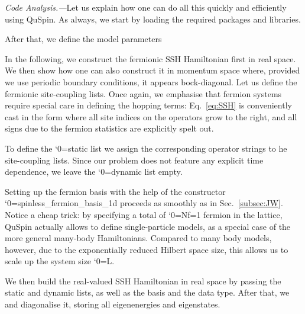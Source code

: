\documentclass{SciPost}
\newcommand\0{\scalebox{-1}[1]{0}}
\let\svttfamily\ttfamily
\renewcommand\ttfamily{\svttfamily\catcode`0=\active }
\renewcommand\texttt{\bgroup\ttfamily\texttthelp}
\def\texttthelp#1{#1\egroup}
\newcommand{\SSHcode}{example5.py}
\begin{document}
\noindent\emph{Code Analysis.---}Let us explain how one can do all this quickly and efficiently using QuSpin. As always, we start by loading the required packages and libraries.

After that, we define the model parameters

In the following, we construct the fermionic SSH Hamiltonian first in real space. We then show how one can also construct it in momentum space where, provided we use periodic boundary conditions, it appears bock-diagonal. Let us define the fermionic site-coupling lists. Once again, we emphasise that fermion systems require special care in defining the hopping terms: Eq.~\eqref{eq:SSH} is conveniently cast in the form where all site indices on the operators grow to the right, and all signs due to the fermion statistics are explicitly spelt out.  

To define the \texttt{static} list we assign the corresponding operator strings to he site-coupling lists. Since our problem does not feature any explicit time dependence, we leave the \texttt{dynamic} list empty.

Setting up the fermion basis with the help of the constructor \texttt{spinless\_fermion\_basis\_1d} proceeds as smoothly as in Sec.~\ref{subsec:JW}. Notice a cheap trick: by specifying a total of \texttt{Nf=1} fermion in the lattice, QuSpin actually allows to define single-particle models, as a special case of the more general many-body Hamiltonians. Compared to many body models, however, due to the exponentially reduced Hilbert space size, this allows us to scale up the system size \texttt{L}. 

We then build the real-valued SSH Hamiltonian in real space by passing the static and dynamic lists, as well as the basis and the data type. After that, we and diagonalise it, storing all eigenenergies and eigenstates.

\end{document}
